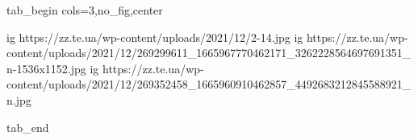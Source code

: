  
 
 
 
 

\ifcmt
  tab_begin cols=3,no_fig,center

  ig https://zz.te.ua/wp-content/uploads/2021/12/2-14.jpg
	ig https://zz.te.ua/wp-content/uploads/2021/12/269299611_1665967770462171_3262228564697691351_n-1536x1152.jpg
	ig https://zz.te.ua/wp-content/uploads/2021/12/269352458_1665960910462857_4492683212845588921_n.jpg

  tab_end
\fi
